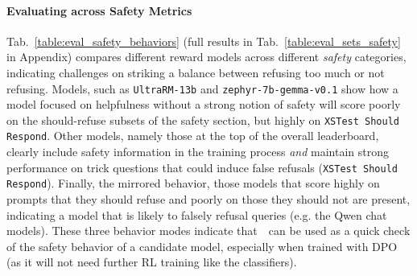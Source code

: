 


\paragraph{Evaluating across Safety Metrics}
Tab.~\ref{table:eval_safety_behaviors} (full results in Tab.~\ref{table:eval_sets_safety} in Appendix) compares different reward models across different {\it safety} categories, indicating  challenges on striking a balance between refusing too much or not refusing. 
Models, such as \texttt{UltraRM-13b} and \texttt{zephyr-7b-gemma-v0.1} show how a model focused on helpfulness without a strong notion of safety will score poorly on the should-refuse subsets of the safety section, but highly on \texttt{XSTest Should Respond}.
Other models, namely those at the top of the overall leaderboard, clearly include safety information in the training process \textit{and} maintain strong performance on trick questions that could induce false refusals (\texttt{XSTest Should Respond}).
Finally, the mirrored behavior, those models that score highly on prompts that they should refuse and poorly on those they should not are present, indicating a model that is likely to falsely refusal queries (e.g. the Qwen chat models).
These three behavior modes indicate that~\name~can be used as a quick check of the safety behavior of a candidate model, especially when trained with DPO (as it will not need further RL training like the classifiers).

